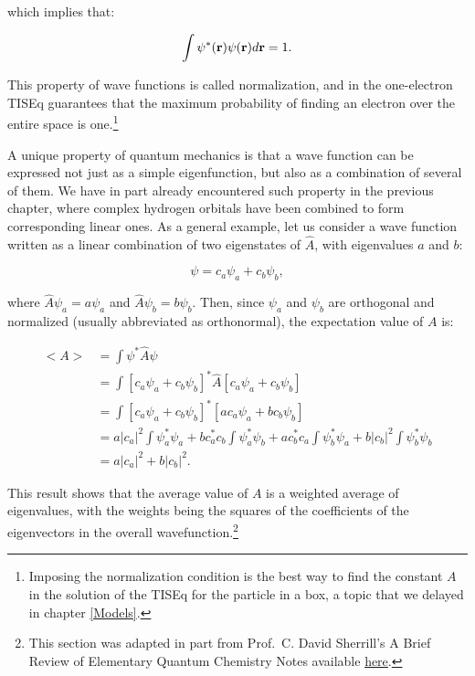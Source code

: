 \documentclass[
  9pt,
]{extbook}
\theoremstyle{definition}
\theoremstyle{definition}
\theoremstyle{definition}
\theoremstyle{remark}
\begin{document}
which implies that:

\begin{equation}
\int \psi^{*}({\bf r}) \psi({\bf r}) d{\bf r} = 1.
\label{eq:ee4}
\end{equation}

This property of wave functions is called normalization, and in the one-electron TISEq guarantees that the maximum probability of finding an electron over the entire space is one.\footnote{Imposing the normalization condition is the best way to find the constant \(A\) in the solution of the TISEq for the particle in a box, a topic that we delayed in chapter \ref{Models}.}

A unique property of quantum mechanics is that a wave function can be expressed not just as a simple eigenfunction, but also as a combination of several of them. We have in part already encountered such property in the previous chapter, where complex hydrogen orbitals have been combined to form corresponding linear ones. As a general example, let us consider a wave function written as a linear combination of two eigenstates of \(\hat{A}\), with eigenvalues \(a\) and \(b\):

\begin{equation}
\psi = c_a \psi_a + c_b \psi_b,
\label{eq:ee5}
\end{equation}

where \(\hat{A} \psi_a = a \psi_a\) and \(\hat{A} \psi_b = b \psi_b\). Then, since \(\psi_a\) and \(\psi_b\) are orthogonal and normalized (usually abbreviated as orthonormal), the expectation value of \(A\) is:

\begin{equation}
\begin{aligned}
<A> &= \int \psi^{*} \hat{A} \psi \\
    &= \int \left[ c_a \psi_a + c_b \psi_b \right]^{*} \hat{A} \left[ c_a \psi_a + c_b \psi_b \right] \\
    &= \int \left[ c_a \psi_a + c_b \psi_b \right]^{*}
\left[ a c_a \psi_a + b c_b \psi_b \right] \\    
    &= a \vert c_a\vert^2 \int \psi_a^{*} \psi_a +
b c_a^{*} c_b \int \psi_a^{*} \psi_b + a c_b^{*} c_a \int \psi_b^{*} \psi_a +
b \vert c_b\vert^2 \int \psi_b^{*} \psi_b \\ 
    &= a \vert c_a\vert^2 + b \vert c_b\vert^2.
\end{aligned}
\label{eq:ee6}    
\end{equation}

This result shows that the average value of \(A\) is a weighted average of eigenvalues, with the weights being the squares of the coefficients of the eigenvectors in the overall wavefunction.\footnote{This section was adapted in part from Prof.~C. David Sherrill's A Brief Review of Elementary Quantum Chemistry Notes available \href{http://vergil.chemistry.gatech.edu/notes/quantrev/node1.html}{here}.}
\end{document}
